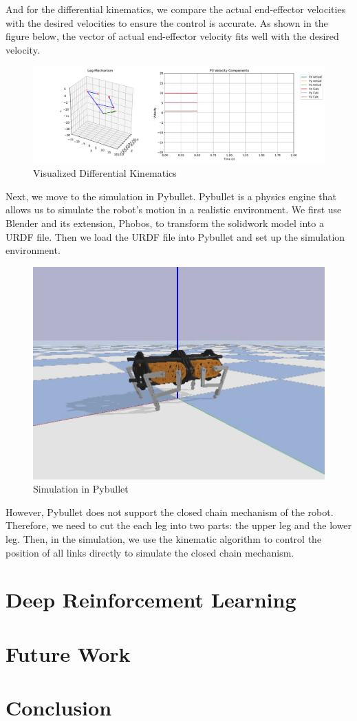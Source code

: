 \documentclass[a4paper,11pt]{article}
\begin{document}
And for the differential kinematics, we compare the actual end-effector velocities with the desired velocities to ensure the control is accurate.
As shown in the figure below, the vector of actual end-effector velocity fits well with the desired velocity.

\begin{figure}[H]
  \centering
	\includegraphics[width=\linewidth]{../../assets/differential_kinematics.pdf}
  \caption{Visualized Differential Kinematics}
  \label{fig:diff}
\end{figure}

Next, we move to the simulation in Pybullet.
Pybullet is a physics engine that allows us to simulate the robot's motion in a realistic environment.
We first use Blender and its extension, Phobos, to transform the solidwork model into a URDF file.
Then we load the URDF file into Pybullet and set up the simulation environment.

\begin{figure}[H]
  \centering
	\includegraphics[width=0.6\linewidth]{../../assets/pybullet.jpg}
  \caption{Simulation in Pybullet}
  \label{fig:bullet}
\end{figure}

However, Pybullet does not support the closed chain mechanism of the robot. Therefore, we need to 
cut the each leg into two parts: the upper leg and the lower leg. Then, in the simulation, 
we use the kinematic algorithm to control the position of all links directly to simulate the
closed chain mechanism.

\section*{Deep Reinforcement Learning}

\section*{Future Work}

\section*{Conclusion}
\end{document}
